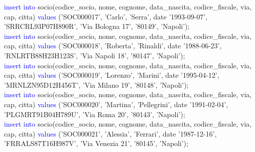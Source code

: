 \documentclass{article}
\begin{document}
\begin{flushleft}
{        \vspace{2mm}
        \hspace*{0.5em}\textcolor{blue}{insert into} socio(codice\_socio, nome, cognome, data\_nascita, codice\_fiscale, via, \hspace*{0.5em}cap, citta) \textcolor{blue}{values} ('SOC000017', 'Carlo', 'Serra', date '1993-09-07', \hspace*{0.4em}'SRRCRL93P07H890R', 'Via Bologna 17', '80149', 'Napoli'); \\
        \newpage
        \hspace*{0.5em}\textcolor{blue}{insert into} socio(codice\_socio, nome, cognome, data\_nascita, codice\_fiscale, via, \hspace*{0.5em}cap, citta) \textcolor{blue}{values} ('SOC000018', 'Roberta', 'Rinaldi', date '1988-06-23', \hspace*{0.4em}'RNLRTB88H23H123S', 'Via Napoli 18', '80147', 'Napoli'); \\
        \vspace{2mm}
        \hspace*{0.5em}\textcolor{blue}{insert into} socio(codice\_socio, nome, cognome, data\_nascita, codice\_fiscale, via, \hspace*{0.5em}cap, citta) \textcolor{blue}{values} ('SOC000019', 'Lorenzo', 'Marini', date '1995-04-12', \hspace*{0.4em}'MRNLZN95D12H456T', 'Via Milano 19', '80148', 'Napoli'); \\
        \vspace{2mm}
        \hspace*{0.5em}\textcolor{blue}{insert into} socio(codice\_socio, nome, cognome, data\_nascita, codice\_fiscale, via, \hspace*{0.5em}cap, citta) \textcolor{blue}{values} ('SOC000020', 'Martina', 'Pellegrini', date '1991-02-04', \hspace*{0.4em}'PLGMRT91B04H789U', 'Via Roma 20', '80143', 'Napoli'); \\
        \vspace{2mm}
        \hspace*{0.5em}\textcolor{blue}{insert into} socio(codice\_socio, nome, cognome, data\_nascita, codice\_fiscale, via, \hspace*{0.5em}cap, citta) \textcolor{blue}{values} ('SOC000021', 'Alessia', 'Ferrari', date '1987-12-16', \hspace*{0.4em}'FRRALS87T16H987V', 'Via Venezia 21', '80145', 'Napoli'); \\
        \vspace{2mm}
}
\end{flushleft}
\end{document}
